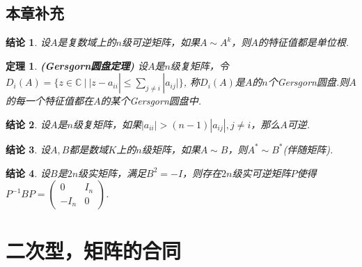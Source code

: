 \documentclass[UTF8]{article}
\newtheorem{thrm}{定理}[subsection]
\newtheorem{ccl}{结论}[subsection]
\begin{document}
\subsection{本章补充}
\begin{ccl}
  设$A$是复数域上的$n$级可逆矩阵，如果$A\sim A^k$，则$A$的特征值都是单位根.
\end{ccl}
\begin{thrm}
  \textbf{(Gersgorn圆盘定理) }设$A$是$n$级复矩阵，令$D_i(A)=\{z\in\mathbb{C}\ |\ |z-a_{ii}|\le \sum\limits_{j\ne i}|a_{ij}|\}$,
  称$D_i(A)$是$A$的$n$个Gersgorn圆盘.则$A$的每一个特征值都在$A$的某个Gersgorn圆盘中.
\end{thrm}
\begin{ccl}
  设$A$是$n$级复矩阵，如果$|a_{ii}|>(n-1)|a_{ij}|,j\ne i$，那么$A$可逆.
\end{ccl}
\begin{ccl}
  设$A,B$都是数域$K$上的$n$级矩阵，如果$A\sim B$，则$A^{*}\sim B^{*}$(伴随矩阵).
\end{ccl}
\begin{ccl}
  设$B$是$2n$级实矩阵，满足$B^2=-I$，则存在$2n$级实可逆矩阵$P$使得$P^{-1}BP=\begin{pmatrix}0&I_n\\-I_n&0\end{pmatrix}$.
\end{ccl}

\section{二次型，矩阵的合同}
\end{document}
